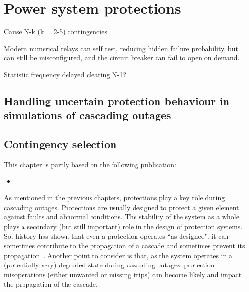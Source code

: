 \chapter{Power system protections}
\label{ch:protections}
\minitoc

Cause N-k (k = 2-5) contingencies

\cite{ProtectionMisoperationsBian2012}




Modern numerical relays can self test, reducing hidden failure probability, but can still be misconfigured, and the circuit breaker can fail to open on demand.

Statistic frequency delayed clearing N-1?

\section{Handling uncertain protection behaviour in simulations of cascading outages}

\section{Contingency selection}


This chapter is partly based on the following publication:
\begin{itemize}
    \item {}
\end{itemize}

As mentioned in the previous chapters, protections play a key role during cascading outages. Protections are usually designed to protect a given element against faults and abnormal conditions. The stability of the system as a whole plays a secondary (but still important) role in the design of protection systems. So, history has shown that even a protection operates ``as designed", it can sometimes contribute to the propagation of a cascade and sometimes prevent its propagation~\cite{PSRCreportProtectionMisop}. Another point to consider is that, as the system operates in a (potentially very) degraded state during cascading outages, protection misoperations (either unwanted or missing trips) can become likely and impact the propagation of the cascade.

